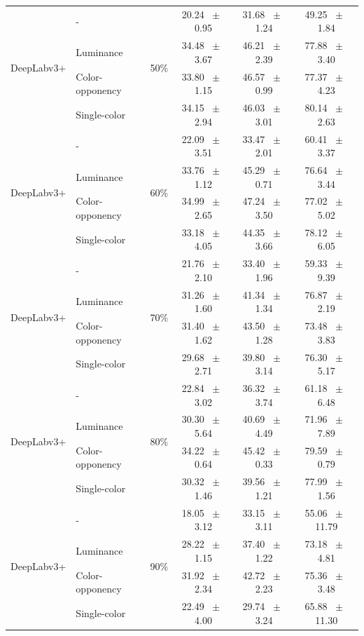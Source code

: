 \begin{table}[h]
\begin{tabular}{@{}l l c c c c@{}}
    \multirow{4}{*}{DeepLabv3+} & - & \multirow{4}{*}{50\%} & 20.24 ~$\pm$~ 0.95 & 31.68 ~$\pm$~ 1.24 & 49.25 ~$\pm$~ 1.84 \\
    & Luminance &  & 34.48 ~$\pm$~ 3.67 & 46.21 ~$\pm$~ 2.39 & 77.88 ~$\pm$~ 3.40 \\
    & Color-opponency &  & 33.80 ~$\pm$~ 1.15 & 46.57 ~$\pm$~ 0.99 & 77.37 ~$\pm$~ 4.23 \\
    & Single-color &  & 34.15 ~$\pm$~ 2.94 & 46.03 ~$\pm$~ 3.01 & 80.14 ~$\pm$~ 2.63 \\
    \midrule
    \multirow{4}{*}{DeepLabv3+} & - & \multirow{4}{*}{60\%} & 22.09 ~$\pm$~ 3.51 & 33.47 ~$\pm$~ 2.01 & 60.41 ~$\pm$~ 3.37 \\
    & Luminance &  & 33.76 ~$\pm$~ 1.12 & 45.29 ~$\pm$~ 0.71 & 76.64 ~$\pm$~ 3.44 \\
    & Color-opponency &  & 34.99 ~$\pm$~ 2.65 & 47.24 ~$\pm$~ 3.50 & 77.02 ~$\pm$~ 5.02 \\
    & Single-color &  & 33.18 ~$\pm$~ 4.05 & 44.35 ~$\pm$~ 3.66 & 78.12 ~$\pm$~ 6.05 \\
    \midrule
    \multirow{4}{*}{DeepLabv3+} & - & \multirow{4}{*}{70\%} & 21.76 ~$\pm$~ 2.10 & 33.40 ~$\pm$~ 1.96 & 59.33 ~$\pm$~ 9.39 \\
    & Luminance &  & 31.26 ~$\pm$~ 1.60 & 41.34 ~$\pm$~ 1.34 & 76.87 ~$\pm$~ 2.19 \\
    & Color-opponency &  & 31.40 ~$\pm$~ 1.62 & 43.50 ~$\pm$~ 1.28 & 73.48 ~$\pm$~ 3.83 \\
    & Single-color &  & 29.68 ~$\pm$~ 2.71 & 39.80 ~$\pm$~ 3.14 & 76.30 ~$\pm$~ 5.17 \\
    \midrule
    \multirow{4}{*}{DeepLabv3+} & - & \multirow{4}{*}{80\%} & 22.84 ~$\pm$~ 3.02 & 36.32 ~$\pm$~ 3.74 & 61.18 ~$\pm$~ 6.48 \\
    & Luminance &  & 30.30 ~$\pm$~ 5.64 & 40.69 ~$\pm$~ 4.49 & 71.96 ~$\pm$~ 7.89 \\
    & Color-opponency &  & 34.22 ~$\pm$~ 0.64 & 45.42 ~$\pm$~ 0.33 & 79.59 ~$\pm$~ 0.79 \\
    & Single-color &  & 30.32 ~$\pm$~ 1.46 & 39.56 ~$\pm$~ 1.21 & 77.99 ~$\pm$~ 1.56 \\
    \midrule
    \multirow{4}{*}{DeepLabv3+} & - & \multirow{4}{*}{90\%} & 18.05 ~$\pm$~ 3.12 & 33.15 ~$\pm$~ 3.11 & 55.06 ~$\pm$~ 11.79 \\
    & Luminance &  & 28.22 ~$\pm$~ 1.15 & 37.40 ~$\pm$~ 1.22 & 73.18 ~$\pm$~ 4.81 \\
    & Color-opponency &  & 31.92 ~$\pm$~ 2.34 & 42.72 ~$\pm$~ 2.23 & 75.36 ~$\pm$~ 3.48 \\
    & Single-color &  & 22.49 ~$\pm$~ 4.00 & 29.74 ~$\pm$~ 3.24 & 65.88 ~$\pm$~ 11.30 \\
    \midrule
    \bottomrule
  \end{tabular}
  \label{tab:deeplabv3plus_acdc_snow}
\end{table}